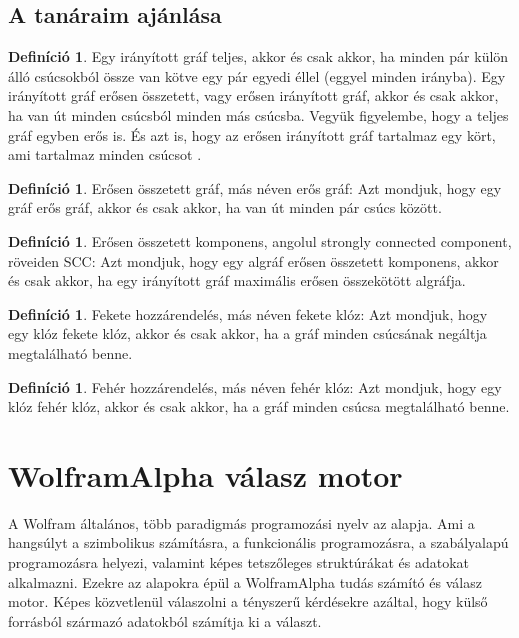 \documentclass[
]{thesis-ekf}
\theoremstyle{definition}
\newtheorem{definicio}[tetel]{Definíció}
\theoremstyle{remark}
\begin{document}
	\subsection{A tanáraim ajánlása}\label{szakirodalom}
	\begin{definicio}
		Egy irányított gráf teljes, akkor és csak akkor, ha minden pár külön álló csúcsokból össze van kötve egy pár egyedi éllel (eggyel minden irányba). Egy irányított gráf erősen összetett, vagy erősen irányított gráf, akkor és csak akkor, ha van út minden csúcsból minden más csúcsba. Vegyük figyelembe, hogy a teljes gráf egyben erős is. És azt is, hogy az erősen irányított gráf tartalmaz egy kört, ami tartalmaz minden csúcsot \cite{synasc2020}.
	\end{definicio}

	\begin{definicio}
		Erősen összetett gráf, más néven erős gráf: Azt mondjuk, hogy egy gráf erős gráf, akkor és csak akkor, ha van út minden pár csúcs között.
	\end{definicio}
	
	\begin{definicio}
		Erősen összetett komponens, angolul strongly connected component, röveiden SCC: Azt mondjuk, hogy egy algráf erősen összetett komponens, akkor és csak akkor, ha egy irányított gráf maximális erősen összekötött algráfja. 
	\end{definicio}
	
	\begin{definicio}
		Fekete hozzárendelés, más néven fekete klóz: Azt mondjuk, hogy egy klóz fekete klóz, akkor és csak akkor, ha a gráf minden csúcsának negáltja megtalálható benne.
	\end{definicio}
	
	\begin{definicio}
		Fehér hozzárendelés, más néven fehér klóz: Azt mondjuk, hogy egy klóz fehér klóz, akkor és csak akkor, ha a gráf minden csúcsa megtalálható benne.
	\end{definicio}
	
	\section{WolframAlpha válasz motor}\label{wolframalpha}
	A Wolfram általános, több paradigmás programozási nyelv az alapja. Ami a hangsúlyt a szimbolikus számításra, a funkcionális programozásra, a szabályalapú programozásra helyezi, valamint képes tetszőleges struktúrákat és adatokat alkalmazni. Ezekre az alapokra épül a WolframAlpha tudás számító és válasz motor. Képes közvetlenül válaszolni a tényszerű kérdésekre azáltal, hogy külső forrásból származó adatokból számítja ki a választ.
	
\end{document}
